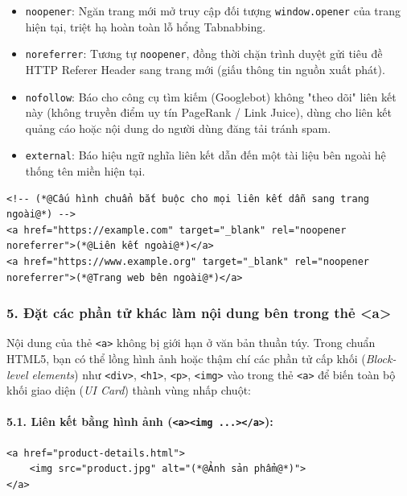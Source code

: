 \documentclass[11pt,oneside]{book}
\newcommand{\codeinline}[1]{\textcolor{accentOrange}{\texttt{#1}}}
\begin{document}
\begin{itemize}[leftmargin=1.5em, itemsep=3pt, parsep=0pt]
    \item \codeinline{noopener}: Ngăn trang mới mở truy cập đối tượng \codeinline{window.opener} của trang hiện tại, triệt hạ hoàn toàn lỗ hổng Tabnabbing.
    \item \codeinline{noreferrer}: Tương tự \codeinline{noopener}, đồng thời chặn trình duyệt gửi tiêu đề HTTP Referer Header sang trang mới (giấu thông tin nguồn xuất phát).
    \item \codeinline{nofollow}: Báo cho công cụ tìm kiếm (Googlebot) không "theo dõi" liên kết này (không truyền điểm uy tín PageRank / Link Juice), dùng cho liên kết quảng cáo hoặc nội dung do người dùng đăng tải tránh spam.
    \item \codeinline{external}: Báo hiệu ngữ nghĩa liên kết dẫn đến một tài liệu bên ngoài hệ thống tên miền hiện tại.
\end{itemize}

\begin{codeWindow}
\begin{lstlisting}[language=HTML5]
<!-- (*@Cấu hình chuẩn bắt buộc cho mọi liên kết dẫn sang trang ngoài@*) -->
<a href="https://example.com" target="_blank" rel="noopener noreferrer">(*@Liên kết ngoài@*)</a>
<a href="https://www.example.org" target="_blank" rel="noopener noreferrer">(*@Trang web bên ngoài@*)</a>
\end{lstlisting}
\end{codeWindow}

\subsubsection{5. Đặt các phần tử khác làm nội dung bên trong thẻ <a>}

Nội dung của thẻ \codeinline{<a>} không bị giới hạn ở văn bản thuần túy. Trong chuẩn HTML5, bạn có thể lồng hình ảnh hoặc thậm chí các phần tử cấp khối (\textit{Block-level elements}) như \codeinline{<div>}, \codeinline{<h1>}, \codeinline{<p>}, \codeinline{<img>} vào trong thẻ \codeinline{<a>} để biến toàn bộ khối giao diện (\textit{UI Card}) thành vùng nhấp chuột:

\paragraph{5.1. Liên kết bằng hình ảnh (\codeinline{<a><img ...></a>}):}
\begin{codeWindow}
\begin{lstlisting}[language=HTML5]
<a href="product-details.html">
    <img src="product.jpg" alt="(*@Ảnh sản phẩm@*)">
</a>
\end{lstlisting}
\end{codeWindow}
\end{document}
